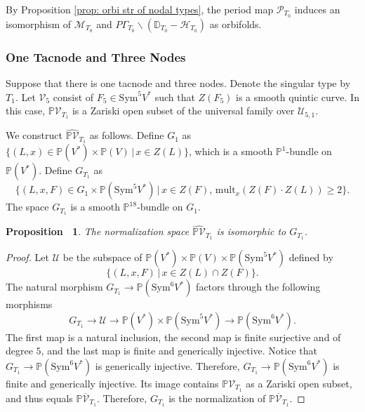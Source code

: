 \documentclass[12pt,reqno,a4paper]{amsart}
\newtheorem{prop}[thm]{Proposition~}
\theoremstyle{remark}
\theoremstyle{definition}
\newcommand{\PP}{\mathbb{P}}
\newcommand{\DD}{\mathbb{D}}
\newcommand{\Prd}{\mathscr{P}}
\newcommand{\calH}{\mathcal{H}}
\newcommand{\calM}{\mathcal{M}}
\newcommand{\calV}{\mathcal{V}}
\newcommand{\calU}{\mathcal{U}}
\newcommand\Sym{\mathrm{Sym}}
\newcommand{\mult}{\mathrm{mult}}
\newcommand{\bs}{\backslash}
\begin{document}
By Proposition \ref{prop: orbi str of nodal types}, the period map $\Prd_{T_0}$ induces an isomorphism of $\calM_{T_0}$ and $P\Gamma_{T_0}\bs(\DD_{T_0}-\calH_{T_0})$ as orbifolds. 


\subsubsection{One Tacnode and Three Nodes}
Suppose that there is one tacnode and three nodes. Denote the singular type by $T_1$.
Let $\calV_{5}$ consist of $F_5\in\Sym^5 V^*$ such that $Z(F_5)$ is a smooth quintic curve.
In this case, $\PP\calV_{T_1}$ is a Zariski open subset of the universal family over $\calU_{5,1}$.

We construct $\widehat{\PP\calV}_{T_1}$ as follows. Define $G_1$ as $\{ 
(L,x)\in\PP(V^*)\times\PP(V) \,|\, x\in Z(L) \}$, which is a smooth $\PP^1$-bundle on $\PP(V^*)$. Define $G_{T_1}$ as 
\begin{equation*}
    \{ (L,x,F)\in G_1\times\PP(\Sym^5 V^*) \,|\, x\in Z(F),\, \mult_x(Z(F)\cdot Z(L))\ge 2 \}.
\end{equation*}
The space $G_{T_1}$ is a smooth $\PP^{18}$-bundle on $G_1$.
\begin{prop}
\label{prop: normalization for quintic plus 1 tangent}
    The normalization space $\widehat{\PP\calV}_{T_1}$ is isomorphic to $G_{T_1}$.
\end{prop}
\begin{proof}
    Let $\calU$ be the subspace of $\PP(V^*)\times\PP(V)\times\PP(\Sym^5 V^*)$ defined by 
    \begin{equation*}
        \{ (L,x,F) \,|\, x\in Z(L)\cap Z(F) \}.
    \end{equation*}
    The natural morphism $G_{T_1}\to \PP(\Sym^6 V^*)$ factors through the following morphisms
    \begin{equation*}
        G_{T_1} \to \calU \to \PP(V^*)\times\PP(\Sym^5 V^*) \to \PP(\Sym^6 V^*).
    \end{equation*}
    The first map is a natural inclusion, the second map is finite surjective and of degree $5$, and the last map is finite and generically injective. Notice that $G_{T_1}\to \PP(\Sym^6 V^*)$ is generically injective. Therefore, $G_{T_1}\to \PP(\Sym^6 V^*)$ is finite and generically injective.
    Its image contains $\PP\calV_{T_1}$ as a Zariski open subset, and thus equals $\PP\overline{\calV}_{T_1}$. Therefore, $G_{T_1}$ is the normalization of $\PP\overline{\calV}_{T_1}$.
\end{proof}
\end{document}
